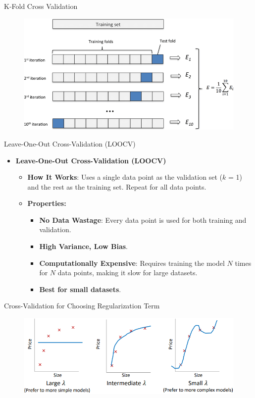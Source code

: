 \documentclass[serif, aspectratio=169]{beamer}
\begin{document}
\begin{frame}{K-Fold Cross Validation}
    \begin{figure}
        \centering
        \includegraphics[width=.8\textwidth]{pic/Figure_28.png}
    \end{figure}
\end{frame}


\begin{frame}{Leave-One-Out Cross-Validation (LOOCV)}
    \begin{itemize}
        \item \textbf{Leave-One-Out Cross-Validation (LOOCV)}
            \medskip
            \begin{itemize}\itemsep1em
            \item \justifying \textbf{How It Works}:
            Uses a single data point as the validation set ($k$ = 1) and the rest as the training set. Repeat for all data points.
            \item \textbf{Properties:}
            \smallskip
            \begin{itemize}\itemsep.5em
                \item \textbf{No Data Wastage}:
                Every data point is used for both training and validation.
                \item \textbf{High Variance, Low Bias}.
                \item \justifying \textbf{Computationally Expensive}: 
                Requires training the model $N$ times for $N$ data points, making it slow for large datasets.
                \item \textbf{Best for small datasets}.
            \end{itemize}
        \end{itemize}
    \end{itemize}
\end{frame}

\begin{frame}{Cross-Validation for Choosing Regularization Term}
    \begin{figure}
        \centering
        \includegraphics[width=0.8\linewidth]{pic/Figure_29.png}
    \end{figure}
\end{frame}
\end{document}

